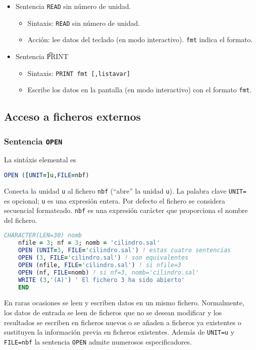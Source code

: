 \begin{itemize}
	\item Sentencia {\tt READ} sin número de unidad.
	\begin{itemize}
		\item Sintaxis: {\tt READ} sin número de unidad.
		\item Acción: lee datos del teclado (en modo interactivo). {\tt fmt} indica el formato.
	\end{itemize}
	\item Sentencia {\t PRINT}
	\begin{itemize}
		\item Sintaxis: {\tt PRINT fmt [,listavar]}
		\item Escribe los datos en la pantalla (en modo interactivo) con el formato {\tt fmt}.
	\end{itemize}
\end{itemize}

\subsection{Acceso a ficheros externos}

\subsubsection{Sentencia \texttt{OPEN}}

La sintáxis elemental es 
\begin{lstlisting}[language=Fortran]
	OPEN ([UNIT=]u,FILE=nbf)
\end{lstlisting}
Conecta la unidad {\tt u} al fichero \texttt{nbf} (``abre'' la unidad {\tt u}). La palabra clave {\tt UNIT=} es opcional; {\tt u} es una expresión entera. Por defecto el fichero se considera secuencial formateado.  {\tt nbf} es una expresión carácter que proporciona el nombre del fichero.

\begin{lstlisting}[language=Fortran]
	CHARACTER(LEN=30) nomb
	nfile = 3; nf = 3; nomb = 'cilindro.sal'
	OPEN (UNIT=3, FILE='cilindro.sal') ! estas cuatro sentencias
	OPEN (3, FILE='cilindro.sal') ! son equivalentes
	OPEN (nfile, FILE='cilindro.sal') ! si nfile=3
	OPEN (nf, FILE=nomb) ! si nf=3, nomb='cilindro.sal'
	WRITE (3,'(A)') ' El fichero 3 ha sido abierto'
	END
\end{lstlisting}

En raras ocasiones se leen y escriben datos en un mismo fichero. Normalmente, los datos de entrada se leen de ficheros que no se desean modificar y los resultados se escriben en ficheros nuevos o se añaden a ficheros ya existentes o sustituyen la información previa en ficheros existentes. Además de {\tt UNIT=u} y {\tt FILE=nbf} la sentencia {\tt OPEN} admite numerosos especificadores.

